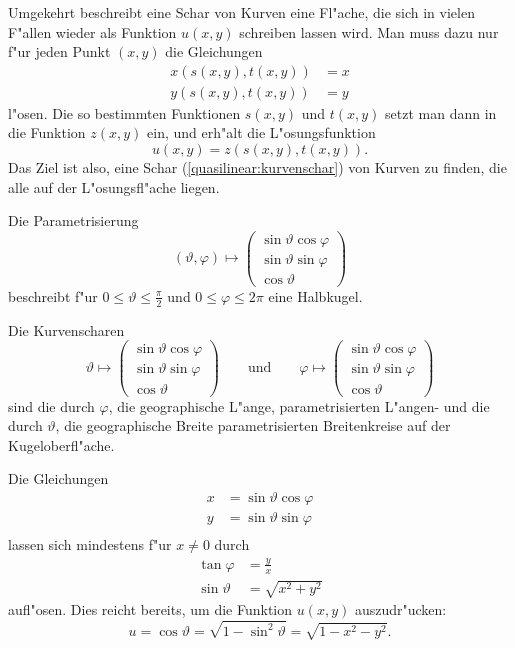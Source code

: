 Umgekehrt beschreibt eine Schar von Kurven eine Fl"ache, die sich
in vielen F"allen wieder als Funktion $u(x,y)$ schreiben lassen wird.
Man muss dazu nur f"ur jeden Punkt $(x,y)$ die Gleichungen
\begin{align*}
x(s(x,y),t(x,y))&=x\\
y(s(x,y),t(x,y))&=y
\end{align*}
l"osen.
Die so bestimmten Funktionen $s(x,y)$ und $t(x,y)$ setzt man dann in
die Funktion $z(x,y)$ ein, und erh"alt die
L"osungsfunktion
\[
u(x,y)=z(s(x,y), t(x,y)).
\]
Das Ziel ist also, eine Schar (\ref{quasilinear:kurvenschar})
von Kurven zu finden, die alle auf der L"osungsfl"ache liegen.

\begin{beispiel}
Die Parametrisierung
\[
(\vartheta,\varphi)\mapsto
\begin{pmatrix}
\sin\vartheta\cos\varphi\\
\sin\vartheta\sin\varphi\\
\cos\vartheta
\end{pmatrix}
\]
beschreibt f"ur $0\le \vartheta\le \frac{\pi}2$
und $0\le\varphi\le 2\pi$ eine Halbkugel.

Die Kurvenscharen
\[
\vartheta\mapsto
\begin{pmatrix}
\sin\vartheta\cos\varphi\\
\sin\vartheta\sin\varphi\\
\cos\vartheta
\end{pmatrix}
\qquad
\text{und}
\qquad
\varphi\mapsto
\begin{pmatrix}
\sin\vartheta\cos\varphi\\
\sin\vartheta\sin\varphi\\
\cos\vartheta
\end{pmatrix}
\]
sind die durch $\varphi$, die geographische L"ange, parametrisierten
L"angen- und die durch $\vartheta$, die geographische Breite
parametrisierten Breitenkreise auf der Kugeloberfl"ache.

Die Gleichungen
\begin{align*}
x&=\sin\vartheta\cos\varphi\\
y&=\sin\vartheta\sin\varphi\\
\end{align*}
lassen sich mindestens f"ur $x\ne 0$ durch
\begin{align*}
\tan\varphi&=\frac{y}{x}\\
\sin\vartheta &=\sqrt{x^2+y^2}
\end{align*}
aufl"osen. Dies reicht bereits, um die Funktion $u(x,y)$
auszudr"ucken:
\[
u=\cos\vartheta=\sqrt{1-\sin^2\vartheta}=\sqrt{1-x^2-y^2}.
\]
\end{beispiel}

